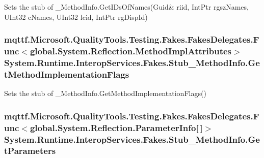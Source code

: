 Sets the stub of \-\_\-\-Method\-Info.\-Get\-I\-Ds\-Of\-Names(Guid\& riid, Int\-Ptr rgsz\-Names, U\-Int32 c\-Names, U\-Int32 lcid, Int\-Ptr rg\-Disp\-Id)

\hypertarget{class_system_1_1_runtime_1_1_interop_services_1_1_fakes_1_1_stub___method_info_a2dcddcb599c6251cd62e545df6cb3956}{
\subsubsection[{Get\-Method\-Implementation\-Flags}]{\setlength{\rightskip}{0pt plus 5cm}mqttf.\-Microsoft.\-Quality\-Tools.\-Testing.\-Fakes.\-Fakes\-Delegates.\-Func$<$global.\-System.\-Reflection.\-Method\-Impl\-Attributes$>$ System.\-Runtime.\-Interop\-Services.\-Fakes.\-Stub\-\_\-\-Method\-Info.\-Get\-Method\-Implementation\-Flags}}\label{class_system_1_1_runtime_1_1_interop_services_1_1_fakes_1_1_stub___method_info_a2dcddcb599c6251cd62e545df6cb3956}


Sets the stub of \-\_\-\-Method\-Info.\-Get\-Method\-Implementation\-Flags()

\hypertarget{class_system_1_1_runtime_1_1_interop_services_1_1_fakes_1_1_stub___method_info_a0286e7deddac284acd39c4235f92346a}{
\subsubsection[{Get\-Parameters}]{\setlength{\rightskip}{0pt plus 5cm}mqttf.\-Microsoft.\-Quality\-Tools.\-Testing.\-Fakes.\-Fakes\-Delegates.\-Func$<$global.\-System.\-Reflection.\-Parameter\-Info\mbox{[}$\,$\mbox{]}$>$ System.\-Runtime.\-Interop\-Services.\-Fakes.\-Stub\-\_\-\-Method\-Info.\-Get\-Parameters}}\label{class_system_1_1_runtime_1_1_interop_services_1_1_fakes_1_1_stub___method_info_a0286e7deddac284acd39c4235f92346a}


